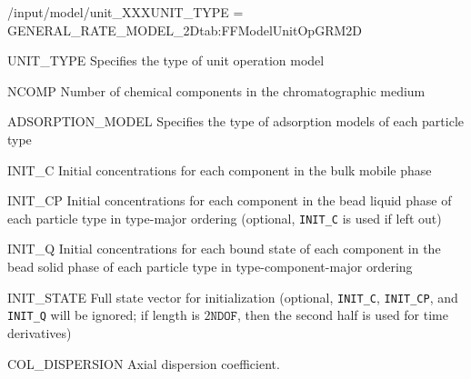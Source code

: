 \begin{condsubgroup}{/input/model/unit\_XXX}{UNIT\_TYPE = GENERAL\_RATE\_MODEL\_2D}{tab:FFModelUnitOpGRM2D}
  \begin{dataset}[type=string,range={\texttt{GENERAL\_RATE\_MODEL\_2D}},length=1]{UNIT\_TYPE}
    Specifies the type of unit operation model
  \end{dataset}
  \begin{dataset}[type=int,range={$\geq 1$},length=1]{NCOMP}
    Number of chemical components in the chromatographic medium
  \end{dataset}
  \begin{dataset}[type=string,range={See Section~\ref{sec:FFAdsorption}},length={\texttt{NPARTYPE}}]{ADSORPTION\_MODEL}
    Specifies the type of adsorption models of each particle type
  \end{dataset}
  \begin{dataset}[unit=\si{\mol\per\cubic\metre\of{IV}},type=double,range={$\geq 0$},length={\texttt{NCOMP}}]{INIT\_C}
    Initial concentrations for each component in the bulk mobile phase
  \end{dataset}
  \begin{dataset}[unit=\si{\mol\per\cubic\metre\of{MP}},type=double,range={$\geq 0$},length={$\texttt{NPARTYPE} \cdot \texttt{NCOMP}$}]{INIT\_CP}
    Initial concentrations for each component in the bead liquid phase of each particle type in type-major ordering (optional, \texttt{INIT\_C} is used if left out)
  \end{dataset}
  \begin{dataset}[unit=\si{\mol\per\cubic\metre\of{SP}},type=double,range={$\geq 0$},length={\texttt{NTOTALBND}}]{INIT\_Q}
    Initial concentrations for each bound state of each component in the bead solid phase of each particle type in type-component-major ordering
  \end{dataset}
  \begin{dataset}[unit=various,type=double,range={$\mathds{R}$},length={\texttt{NDOF} / $2\texttt{NDOF}$}]{INIT\_STATE}
    Full state vector for initialization (optional, \texttt{INIT\_C}, \texttt{INIT\_CP}, and \texttt{INIT\_Q} will be ignored; if length is $2\texttt{NDOF}$, then the second half is used for time derivatives)
  \end{dataset}
  \begin{dataset}[unit=\si{\square\metre\of{IV}\per\second},type=double,range={$\geq 0$},length={see \texttt{COL\_DISPERSION\_MULTIPLEX}}]{COL\_DISPERSION}
    Axial dispersion coefficient.


\end{dataset}
\end{condsubgroup}
